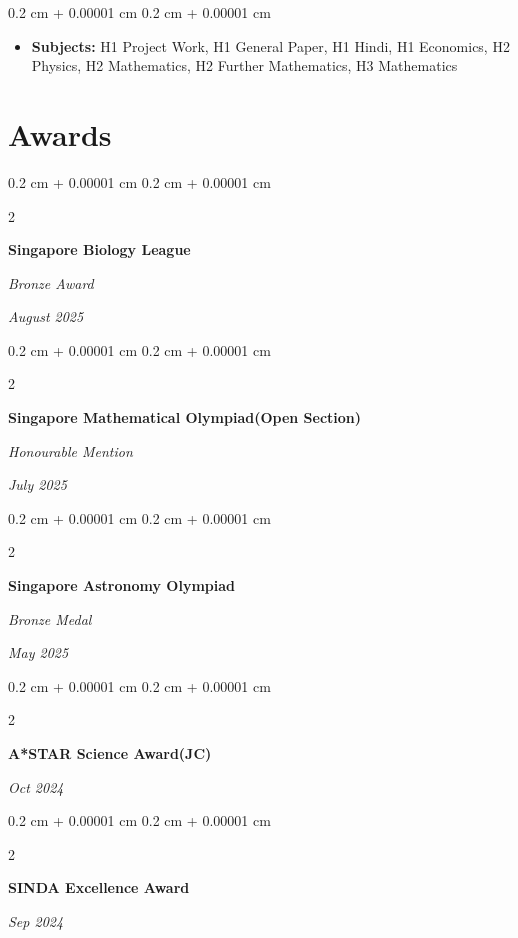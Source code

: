 \documentclass[10pt, letterpaper]{article}
\newenvironment{highlights}{
    \begin{itemize}[
        topsep=0.10 cm,
        parsep=0.10 cm,
        partopsep=0pt,
        itemsep=0pt,
        leftmargin=0.4 cm + 10pt
    ]
}{
    \end{itemize}
} %
\newenvironment{onecolentry}{
    \begin{adjustwidth}{
        0.2 cm + 0.00001 cm
    }{
        0.2 cm + 0.00001 cm
    }
}{
    \end{adjustwidth}
} %
\newenvironment{twocolentry}[2][]{
    \onecolentry
    \def\secondColumn{#2}
    \setcolumnwidth{\fill, 4.5 cm}
    \begin{paracol}{2}
}{
    \switchcolumn \raggedleft \secondColumn
    \end{paracol}
    \endonecolentry
} %
\begin{document}
        \vspace{0.10 cm}
        \begin{onecolentry}
            \begin{highlights}
                \item \textbf{Subjects:} H1 Project Work, H1 General Paper, H1 Hindi, H1 Economics, H2 Physics, H2 Mathematics, H2 Further Mathematics, H3 Mathematics
            \end{highlights}
        \end{onecolentry}




    
    



    
    \section{Awards}
     \begin{twocolentry}{

            
        \textit{August 2025}}
            \textbf{Singapore Biology League}

            \textit{Bronze Award}
        \end{twocolentry}
     \begin{twocolentry}{

            
        \textit{July 2025}}
            \textbf{Singapore Mathematical Olympiad(Open Section)}

            \textit{Honourable Mention}
        \end{twocolentry}

         \begin{twocolentry}{
            
            
        \textit{May 2025}}
            \textbf{Singapore Astronomy Olympiad}

            \textit{Bronze Medal}
        \end{twocolentry}


         \begin{twocolentry}{
            
            
        \textit{Oct 2024}}
            \textbf{A*STAR Science Award(JC)}

        \end{twocolentry}

        \begin{twocolentry}{
            
            
        \textit{Sep 2024}}
            \textbf{SINDA Excellence Award}

        \end{twocolentry}
\end{document}
